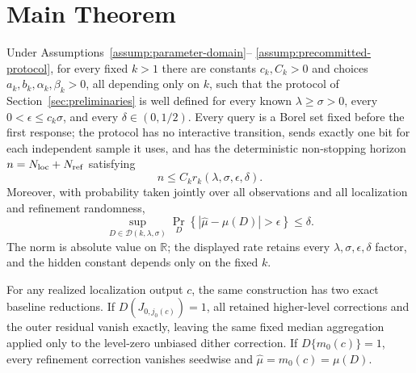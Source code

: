 \section{Main Theorem}

\begin{theorem}
\label{thm:main}
Under Assumptions~\ref{assump:parameter-domain}--
\ref{assump:precommitted-protocol}, for every fixed $k>1$ there are constants
$c_k,C_k>0$ and choices $a_k,b_k,\alpha_k,\beta_k>0$, all depending only on
$k$, such that the protocol of Section~\ref{sec:preliminaries} is well defined
for every known $\lambda\geq\sigma>0$, every
$0<\epsilon\leq c_k\sigma$, and every $\delta\in(0,1/2)$.  Every query is a
Borel set fixed before the first response; the protocol has no interactive
transition, sends exactly one bit for each independent sample it uses, and has
the deterministic non-stopping horizon $n=N_{\rm loc}+N_{\rm ref}$ satisfying
\[
 n\leq C_k r_k(\lambda,\sigma,\epsilon,\delta).
\]
Moreover, with probability taken jointly over all observations and all
localization and refinement randomness,
\[
 \sup_{D\in\mathcal D(k,\lambda,\sigma)}
 \Pr_D\left\{|\widehat\mu-\mu(D)|>\epsilon\right\}\leq\delta.
\]
The norm is absolute value on $\mathbb R$; the displayed rate retains every
$\lambda,\sigma,\epsilon,\delta$ factor, and the hidden constant depends only
on the fixed $k$.

For any realized localization output $c$, the same construction has two exact
baseline reductions.  If $D(J_{0,j_0(c)})=1$, all retained higher-level
corrections and the outer residual vanish exactly, leaving the same fixed
median aggregation applied only to the level-zero unbiased dither correction.
If $D\{m_0(c)\}=1$, every refinement correction vanishes seedwise and
$\widehat\mu=m_0(c)=\mu(D)$.
\end{theorem}

